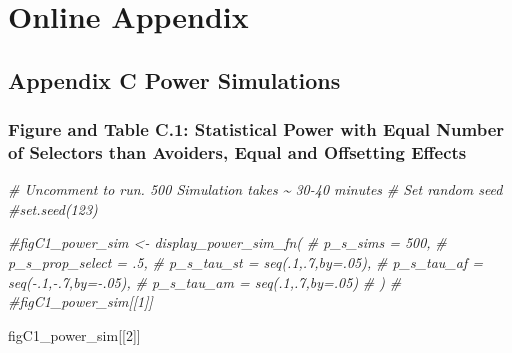 \documentclass[
]{article}
\newenvironment{Shaded}{\begin{snugshade}}{\end{snugshade}}
\newcommand{\CommentTok}[1]{\textcolor[rgb]{0.56,0.35,0.01}{\textit{#1}}}
\newcommand{\DecValTok}[1]{\textcolor[rgb]{0.00,0.00,0.81}{#1}}
\newcommand{\NormalTok}[1]{#1}
\begin{document}
\hypertarget{online-appendix}{%
\section{Online Appendix}\label{online-appendix}}

\hypertarget{appendix-c-power-simulations}{%
\subsection{Appendix C Power
Simulations}\label{appendix-c-power-simulations}}

\setcounter{table}{0}
\renewcommand{\thetable}{C.\arabic{table}}
\setcounter{figure}{0}
\renewcommand{\thefigure}{C.\arabic{figure}}

\hypertarget{figure-and-table-c.1-statistical-power-with-equal-number-of-selectors-than-avoiders-equal-and-offsetting-effects}{%
\subsubsection{Figure and Table C.1: Statistical Power with Equal Number
of Selectors than Avoiders, Equal and Offsetting
Effects}\label{figure-and-table-c.1-statistical-power-with-equal-number-of-selectors-than-avoiders-equal-and-offsetting-effects}}

\begin{Shaded}
\begin{Highlighting}[]
\CommentTok{\# Uncomment to run. 500 Simulation takes \textasciitilde{} 30{-}40 minutes}
\CommentTok{\# Set random seed}
\CommentTok{\#set.seed(123)}

\CommentTok{\#figC1\_power\_sim \textless{}{-} display\_power\_sim\_fn(}
\CommentTok{\#                      p\_s\_sims = 500,}
\CommentTok{\#                       p\_s\_prop\_select = .5,}
\CommentTok{\#                       p\_s\_tau\_st = seq(.1,.7,by=.05),}
\CommentTok{\#                       p\_s\_tau\_af = seq({-}.1,{-}.7,by={-}.05),}
\CommentTok{\#                       p\_s\_tau\_am = seq(.1,.7,by=.05)}
\CommentTok{\#                       )}
\CommentTok{\#}
\CommentTok{\#figC1\_power\_sim[[1]]}
\end{Highlighting}
\end{Shaded}

\begin{Shaded}
\begin{Highlighting}[]
\NormalTok{figC1\_power\_sim[[}\DecValTok{2}\NormalTok{]]}
\end{Highlighting}
\end{Shaded}
\end{document}
